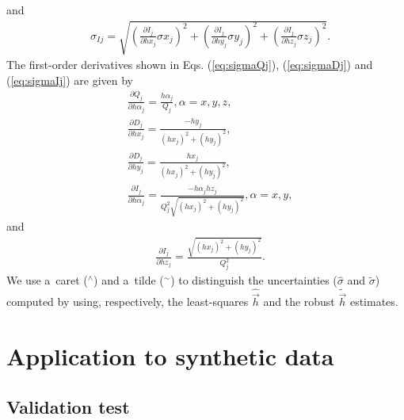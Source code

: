 \documentclass[journal abbreviation, npg]{copernicus}
\begin{document}
and
\begin{align}
 &
\sigma_{Ij} = \sqrt{\left(\frac{\partial I_{j}}{\partial hx_{j}}  \sigma x_{j} \right)^{2} +
                    \left(\frac{\partial I_{j}}{\partial hy_{j}}  \sigma y_{j} \right)^{2} +
                    \left(\frac{\partial I_{j}}{\partial hz_{j}}  \sigma z_{j} \right)^{2}} .
\label{eq:sigmaIj}
\end{align}
The first-order derivatives shown in Eqs. (\ref{eq:sigmaQj}), (\ref{eq:sigmaDj}) and (\ref{eq:sigmaIj}) are given by
\begin{align}
 &
\frac{\partial Q_{j}}{\partial h \alpha_{j}} = \frac{h \alpha_{j}}{Q_{j}} ,  \alpha = x, y, z ,
\label{eq:dQj-dhalphaj}
\\
&
\frac{\partial D_{j}}{\partial hx_{j}} = \frac{- hy_{j}}{\left(hx_{j} \right)^{2} + \left(hy_{j} \right)^{2}} ,
\label{eq:dDj-dhxj}
\\
&
\frac{\partial D_{j}}{\partial hy_{j}} = \frac{hx_{j}} {\left(hx_{j} \right)^{2} + \left(hy_{j} \right)^{2}} ,
\label{eq:dDj-dhyj}
\\
&
\frac{\partial I_{j}}{\partial h \alpha_{j}} = \frac{-h \alpha_{j} hz_{j}}{Q_{j}^{2} \sqrt{\left(hx_{j} \right)^{2} + \left(hy_{j} \right)^{2}}} ,  \alpha = x, y ,
\label{eq:dIj-dhalphaj}
\end{align}
and
\begin{align}
 &
\frac{\partial I_{j}}{\partial hz_{j}} = \frac{\sqrt{(hx_{j} )^{2} + (hy_{j} )^{2}}} {Q_{j}^{2}} .
\label{eq:dIj-dhzj}
\end{align}
We use a~caret ($^{\wedge}$) and a~tilde ($^{\sim}$) to distinguish
the uncertainties ($\hat{\sigma}$ and $\tilde{\sigma}$) computed by
using, respectively, the least-squares $\hat{\vec{h}}$ and the robust
$\tilde{\vec{h}}$ estimates.

\section{Application to synthetic data}

\subsection{Validation test}
\end{document}
